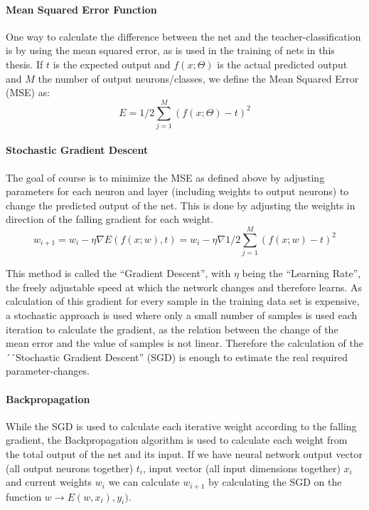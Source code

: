\paragraph{Mean Squared Error Function}

One way to calculate the difference between the net and the teacher-classification is by using the mean squared error, as is used in the training of nets in this thesis. If  \(t\) is the expected output and \(f(x;\Theta)\) is the actual predicted output and \(M\) the number of output neurons/classes, we define the Mean Squared Error (MSE) as:
\begin{equation}
E = 1 / 2 \sum_{j=1}^{M}(f(x;\Theta) - t)^2
\end{equation}

\paragraph{Stochastic Gradient Descent} The goal of course is to minimize the MSE as defined above by adjusting parameters for each neuron and layer (including weights to output neurons) to change the predicted output of the net.  This is done by adjusting the weights in direction of the falling gradient for each weight.
\begin{equation}
w_{i+1} = w_i - \eta \nabla E(f(x;w), t) = w_i - \eta \nabla 1/2\sum_{j=1}^M(f(x;w) - t)^2
\end {equation}

This method is called the ``Gradient Descent'', with \(\eta\) being the ``Learning Rate'', the freely adjustable speed at which the network changes and therefore learns. As calculation of this gradient for every sample in the training data set is expensive, a stochastic approach is used where only a small number of samples is used each iteration to calculate the gradient, as the relation between the change of the mean error and the value of samples is not linear. Therefore the calculation of the ´´Stochastic Gradient Descent'' (SGD) is enough to estimate the real required parameter-changes.

\paragraph{Backpropagation} While the SGD is used to calculate each iterative weight according to the falling gradient, the Backpropagation algorithm is used to calculate each weight from the total output of the net and its input. If we have neural network output vector (all output neurons together) \(t_i\), input vector (all input dimensions together) \(x_i\) and current weights \(w_i\) we can calculate \(w_{i+1}\) by calculating the SGD on the function \(w \rightarrow E(w, x_i), y_i)\).

